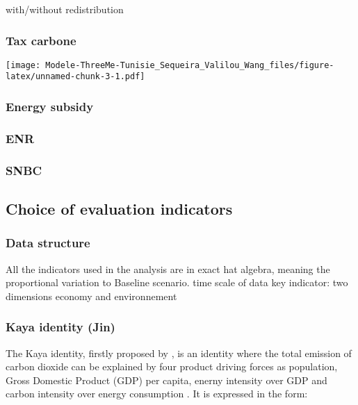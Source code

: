 \documentclass[
]{article}
\begin{document}
with/without redistribution

\hypertarget{tax-carbone}{%
\subsubsection{Tax carbone}\label{tax-carbone}}

\texttt{[image: Modele-ThreeMe-Tunisie\_Sequeira\_Valilou\_Wang\_files/figure-latex/unnamed-chunk-3-1.pdf]}

\hypertarget{energy-subsidy}{%
\subsubsection{Energy subsidy}\label{energy-subsidy}}

\hypertarget{enr}{%
\subsubsection{ENR}\label{enr}}

\hypertarget{snbc}{%
\subsubsection{SNBC}\label{snbc}}

\hypertarget{choice-of-evaluation-indicators}{%
\subsection{Choice of evaluation
indicators}\label{choice-of-evaluation-indicators}}

\hypertarget{data-structure}{%
\subsubsection{Data structure}\label{data-structure}}

All the indicators used in the analysis are in exact hat algebra,
meaning the proportional variation to Baseline scenario. time scale of
data key indicator: two dimensions economy and environnement

\hypertarget{kaya-identity-jin}{%
\subsubsection{Kaya identity (Jin)}\label{kaya-identity-jin}}

The Kaya identity, firstly proposed by \autocite{kaya1989}, is an
identity where the total emission of carbon dioxide can be explained by
four product driving forces as population, Gross Domestic Product (GDP)
per capita, enerny intensity over GDP and carbon intensity over energy
consumption \autocite{kayaide2021}. It is expressed in the form:
\end{document}
